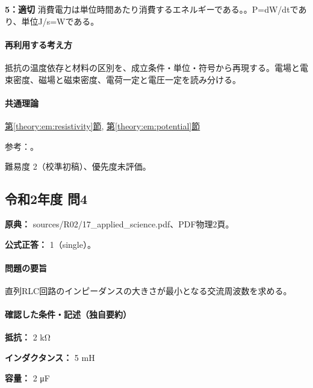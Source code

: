 \noindent\textbf{5：適切} 消費電力は単位時間あたり消費するエネルギーである。。P=\allowbreak{}dW/dtであり、単位J/s=\allowbreak{}Wである。\par

\paragraph{再利用する考え方} 抵抗の温度依存と材料の区別を、成立条件・単位・符号から再現する。電場と電束密度、磁場と磁束密度、電荷一定と電圧一定を読み分ける。

\paragraph{共通理論} \hyperref[theory:em:resistivity]{第\ref*{theory:em:resistivity}節}, \hyperref[theory:em:potential]{第\ref*{theory:em:potential}節}

\par 参考：\cite{mit_em06,mit_semiconductor}。

\par 難易度 2（校準初稿）、優先度未評価。

\subsection{令和2年度 問4}
\label{q:r02-reg-applied-04}

\noindent\textbf{原典：} sources/R02/17\_applied\_science.pdf、PDF物理2頁。

\textbf{公式正答：} 1（single）。

\paragraph{問題の要旨} 直列RLC回路のインピーダンスの大きさが最小となる交流周波数を求める。

\paragraph{確認した条件・記述（独自要約）}\mbox{}\par

\noindent\textbf{抵抗：} 2 kΩ\par

\noindent\textbf{インダクタンス：} 5 mH\par

\noindent\textbf{容量：} 2 μF\par

